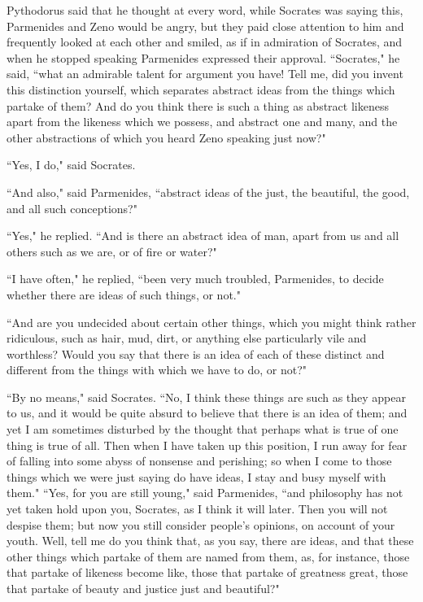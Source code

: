 \documentclass[letterpaper,12pt]{article}
\newcommand{\stephpag}[1]{\marginnote{\small\itshape\fontfamily{ppl}\selectfont #1}}
\begin{document}
Pythodorus said that he thought at every word, while Socrates was saying this, Parmenides and Zeno would be angry, but they paid close attention to him and frequently looked at each other and smiled, as if in admiration of Socrates, and when he stopped speaking Parmenides expressed their approval. ``Socrates," \stephpag{b} he said, ``what an admirable talent for argument you have! Tell me, did you invent this distinction yourself, which separates abstract ideas from the things which partake of them? And do you think there is such a thing as abstract likeness apart from the likeness which we possess, and abstract one and many, and the other abstractions of which you heard Zeno speaking just now?"

``Yes, I do," said Socrates.

``And also," said Parmenides, ``abstract ideas of the just, the beautiful, the good, and all such conceptions?"

``Yes," he replied. \stephpag{c} ``And is there an abstract idea of man, apart from us and all others such as we are, or of fire or water?"

``I have often," he replied, ``been very much troubled, Parmenides, to decide whether there are ideas of such things, or not."

``And are you undecided about certain other things, which you might think rather ridiculous, such as hair, mud, dirt, or anything else particularly vile and worthless? Would you say that there is an idea of each of these distinct and different from the things \stephpag{d} with which we have to do, or not?"

``By no means," said Socrates. ``No, I think these things are such as they appear to us, and it would be quite absurd to believe that there is an idea of them; and yet I am sometimes disturbed by the thought that perhaps what is true of one thing is true of all. Then when I have taken up this position, I run away for fear of falling into some abyss of nonsense and perishing; so when I come to those things which we were just saying do have ideas, I stay and busy myself with them." \stephpag{e} ``Yes, for you are still young," said Parmenides, ``and philosophy has not yet taken hold upon you, Socrates, as I think it will later. Then you will not despise them; but now you still consider people's opinions, on account of your youth. Well, tell me do you think that, as you say, there are ideas, and that these other things which partake of them are named from them, \stephpag{131 a} as, for instance, those that partake of likeness become like, those that partake of greatness great, those that partake of beauty and justice just and beautiful?"
\end{document}
